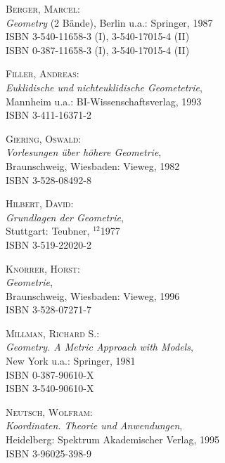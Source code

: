 \begin{description}

\item \textsc{Berger, Marcel}: \\ 
\textit{Geometry} (2 B\"ande),
Berlin u.a.: Springer, 1987 \\
ISBN 3-540-11658-3 (I), 3-540-17015-4 (II) \\
ISBN 0-387-11658-3 (I), 3-540-17015-4 (II)

\item \textsc{Filler, Andreas}: \\
\textit{Euklidische und nichteuklidische Geometetrie}, \\
Mannheim u.a.: BI-Wissenschaftsverlag, 1993 \\
ISBN 3-411-16371-2

\item \textsc{Giering, Oswald}: \\ 
\textit{Vorlesungen \"uber h\"ohere Geometrie}, \\
Braunschweig, Wiesbaden: Vieweg, 1982 \\
ISBN 3-528-08492-8

\item \textsc{Hilbert, David}: \\ 
\textit{Grundlagen der Geometrie}, \\
Stuttgart: Teubner, $^12$1977 \\
ISBN 3-519-22020-2

\item \textsc{Kn\"orrer, Horst}: \\ 
\textit{Geometrie}, \\
Braunschweig, Wiesbaden: Vieweg, 1996 \\
ISBN 3-528-07271-7

\item \textsc{Millman, Richard S.}: \\ 
\textit{Geometry. A Metric Approach with Models}, \\
New York u.a.: Springer, 1981 \\
ISBN 0-387-90610-X \\
ISBN 3-540-90610-X

\item \textsc{Neutsch, Wolfram}: \\ 
\textit{Koordinaten. Theorie und Anwendungen}, \\
Heidelberg: Spektrum Akademischer Verlag, 1995 \\
ISBN 3-96025-398-9

\end{description}

